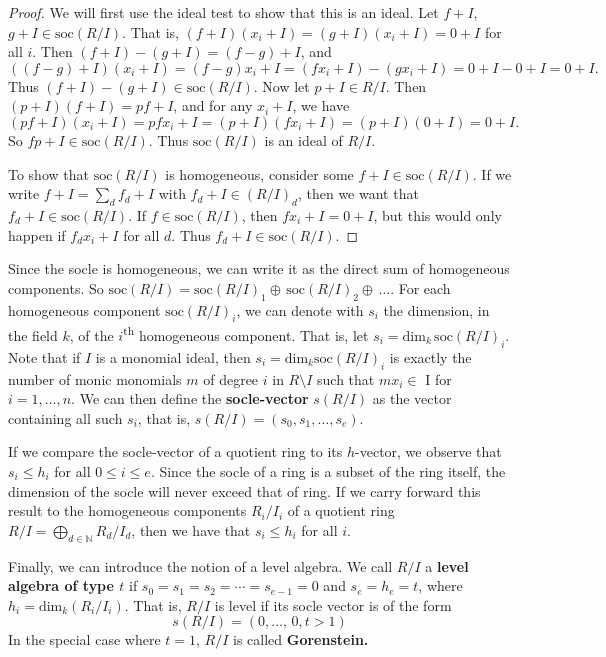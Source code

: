 \begin{proof} We will first use the ideal test to show that this is an ideal. Let $f + I$, $g+I \in \textrm{soc}(R/I)$. That is, $(f+I)(x_i + I) = (g+I) (x_i+I) = 0 + I$ for all $i$. 
Then $(f+I) - (g+I)  = (f-g) + I$, and 
$$
((f-g) + I)(x_i+I) = (f-g)x_i + I = (f x_i + I) - (g x_i + I) = 0 + I - 0 + I = 0 +I.
$$
Thus $(f+I) - (g+I) \in \textrm{soc} (R/I)$. 
Now let $p + I \in R/I$. Then $(p+I)(f+I) = pf + I$, and for any $x_i + I$, we have
$$
(pf + I) (x_i + I) = pfx_i + I = (p+I) (fx_i + I) = (p+I)(0+I) = 0+I.
$$
So $fp + I \in \textrm{soc} (R/I).$ Thus $\textrm{soc} (R/I)$ is an ideal of $R/I$. 

To show that $\textrm{soc}(R/I)$ is homogeneous, consider some $f+I \in \textrm{soc}(R/I)$. If we write $f+I = \sum_{d} f_d +I $ with $f_d+I \in (R/I)_d$, then we want that $f_d +I\in \textrm{soc}(R/I)$. If $f \in \textrm{soc}(R/I)$, then $f x_i +I = 0 + I$, but this would only happen if $f_d x_i +I$ for all $d$. Thus $f_d + I \in \textrm{soc} (R/I)$. 
\end{proof}

Since the socle is homogeneous, we can write it as the direct sum of homogeneous components. So $\textrm{soc}(R/I) = \textrm{soc}(R/I)_1 \oplus \, \textrm{soc}(R/I)_2 \oplus \, \dots $. For each homogeneous component $\textrm{soc}(R/I)_i$, we can denote with $s_i$ the dimension, in the field $k$, of the $i$\textsuperscript{th} homogeneous component. That is, let $s_i = \textrm{dim}_k \, \textrm{soc}(R/I)_i$. Note that if $I$ is a monomial ideal, then   $s_i = \textrm{dim}_k \textrm{soc} (R/I)_i $  is exactly the number of monic monomials $m$ of degree $i$ in $R \setminus I$ such that $mx_i \in $ I for $i = 1, \dots, n$.  We can then define the \textbf{socle-vector} $s(R/I)$ as the vector containing all such $s_i$, that is, $s(R/I) = (s_0, s_1, \dots, s_e)$.

If we compare the socle-vector of a quotient ring to its $h$-vector, we observe that $s_i \leq h_i$ for all $0 \leq i \leq e$. Since the socle of a ring is a subset of the ring itself, the dimension of the socle will never exceed that of ring. If we carry forward this result to the homogeneous components $R_i/I_i$ of a quotient ring $R/I = \bigoplus \limits_{d \in \mathbb{N}} R_d /I_d$, then we have that $s_i \leq h_i$ for all $i$. 

Finally, we can introduce the notion of a level algebra. We call $R/I$ a \textbf{level algebra of type $t$} if $s_0 = s_1 = s_2 = \cdots = s_{e-1} = 0$ and $s_e = h_e = t$, where $h_i = \textrm{dim}_k (R_i / I_i)$. That is, $R/I$ is level if its socle vector is of the form
$$
s(R/I) = (0, \dots, \, 0, t > 1) 
$$
In the special case where $t = 1$, $R/I$ is called \textbf{Gorenstein.}

